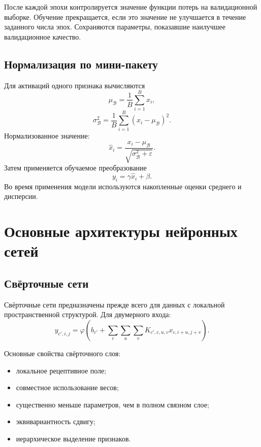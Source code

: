 \documentclass[12pt,a4paper]{article}
\theoremstyle{definition}
\newcommand{\1}{\mathbf{1}}
\newcommand{\eps}{\varepsilon}
\begin{document}
После каждой эпохи контролируется значение функции потерь на
валидационной выборке. Обучение прекращается, если это значение
не улучшается в течение заданного числа эпох. Сохраняются параметры,
показавшие наилучшее валидационное качество.

\subsection{Нормализация по мини-пакету}

Для активаций одного признака вычисляются
\[
    \mu_{\mathcal{B}}
    =
    \frac{1}{B}\sum_{i=1}^{B}x_i,
\]
\[
    \sigma_{\mathcal{B}}^2
    =
    \frac{1}{B}\sum_{i=1}^{B}(x_i-\mu_{\mathcal{B}})^2.
\]
Нормализованное значение:
\[
    \widehat{x}_i
    =
    \frac{x_i-\mu_{\mathcal{B}}}
         {\sqrt{\sigma_{\mathcal{B}}^2+\eps}}.
\]
Затем применяется обучаемое преобразование
\[
    y_i=\gamma\widehat{x}_i+\beta.
\]
Во время применения модели используются накопленные оценки среднего
и дисперсии.

\section{Основные архитектуры нейронных сетей}

\subsection{Свёрточные сети}

Свёрточные сети предназначены прежде всего для данных с локальной
пространственной структурой. Для двумерного входа:
\[
    y_{c',i,j}
    =
    \varphi\left(
        b_{c'}
        +
        \sum_{c}
        \sum_{u}
        \sum_{v}
        K_{c',c,u,v}
        x_{c,i+u,j+v}
    \right).
\]

Основные свойства свёрточного слоя:

\begin{itemize}
    \item локальное рецептивное поле;
    \item совместное использование весов;
    \item существенно меньше параметров, чем в полном связном слое;
    \item эквивариантность сдвигу;
    \item иерархическое выделение признаков.
\end{itemize}
\end{document}

